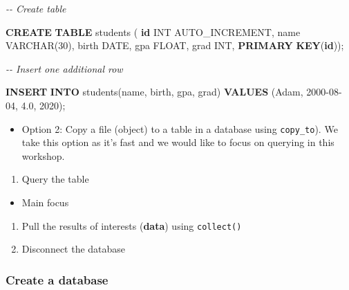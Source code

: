 \documentclass[
]{book}
\newenvironment{Shaded}{\begin{snugshade}}{\end{snugshade}}
\newcommand{\CommentTok}[1]{\textcolor[rgb]{0.56,0.35,0.01}{\textit{#1}}}
\newcommand{\DataTypeTok}[1]{\textcolor[rgb]{0.13,0.29,0.53}{#1}}
\newcommand{\DecValTok}[1]{\textcolor[rgb]{0.00,0.00,0.81}{#1}}
\newcommand{\FloatTok}[1]{\textcolor[rgb]{0.00,0.00,0.81}{#1}}
\newcommand{\KeywordTok}[1]{\textcolor[rgb]{0.13,0.29,0.53}{\textbf{#1}}}
\newcommand{\NormalTok}[1]{#1}
\newcommand{\StringTok}[1]{\textcolor[rgb]{0.31,0.60,0.02}{#1}}
\providecommand{\tightlist}{%
  \setlength{\itemsep}{0pt}\setlength{\parskip}{0pt}}
\begin{document}
\begin{Shaded}
\begin{Highlighting}[]

\CommentTok{{-}{-} Create table }

\KeywordTok{CREATE} \KeywordTok{TABLE}\NormalTok{ students (}
    \KeywordTok{id} \DataTypeTok{INT}\NormalTok{ AUTO\_INCREMENT,}
\NormalTok{    name }\DataTypeTok{VARCHAR}\NormalTok{(}\DecValTok{30}\NormalTok{),}
\NormalTok{    birth }\DataTypeTok{DATE}\NormalTok{,}
\NormalTok{    gpa }\DataTypeTok{FLOAT}\NormalTok{,}
\NormalTok{    grad }\DataTypeTok{INT}\NormalTok{,}
    \KeywordTok{PRIMARY} \KeywordTok{KEY}\NormalTok{(}\KeywordTok{id}\NormalTok{));}

\CommentTok{{-}{-} Insert one additional row }

\KeywordTok{INSERT} \KeywordTok{INTO}\NormalTok{ students(name, birth, gpa, grad)}
      \KeywordTok{VALUES}\NormalTok{ (}\StringTok{\textquotesingle{}Adam\textquotesingle{}}\NormalTok{, }\StringTok{\textquotesingle{}2000{-}08{-}04\textquotesingle{}}\NormalTok{, }\FloatTok{4.0}\NormalTok{, }\DecValTok{2020}\NormalTok{);}
\end{Highlighting}
\end{Shaded}

\begin{itemize}
\tightlist
\item
  Option 2: Copy a file (object) to a table in a database using \texttt{copy\_to}). We take this option as it's fast and we would like to focus on querying in this workshop.
\end{itemize}

\begin{enumerate}
\def\labelenumi{\arabic{enumi}.}
\setcounter{enumi}{2}
\tightlist
\item
  Query the table
\end{enumerate}

\begin{itemize}
\tightlist
\item
  Main focus
\end{itemize}

\begin{enumerate}
\def\labelenumi{\arabic{enumi}.}
\setcounter{enumi}{3}
\item
  Pull the results of interests (\textbf{data}) using \texttt{collect()}
\item
  Disconnect the database
\end{enumerate}

\hypertarget{create-a-database}{%
\subsubsection{Create a database}\label{create-a-database}}
\end{document}
